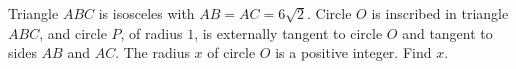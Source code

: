Triangle $ABC$ is isosceles with $AB=AC=6\sqrt{2}$. Circle $O$ is inscribed in triangle $ABC$, and circle $P$, of radius $1$, is externally tangent to circle $O$ and tangent to sides $AB$ and $AC$. The radius $x$ of circle $O$ is a positive integer. Find $x$.
